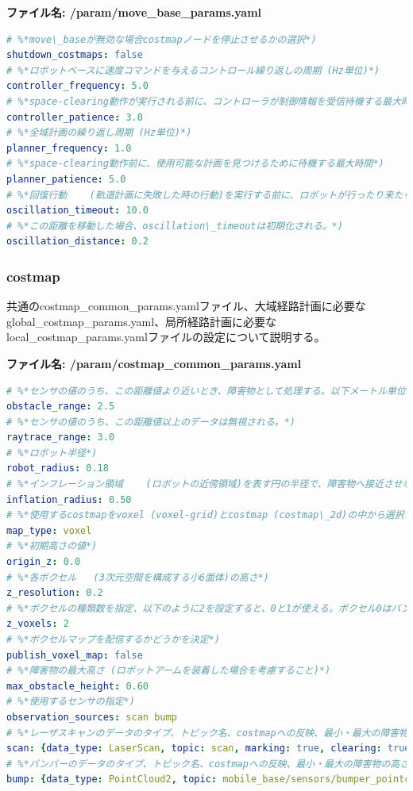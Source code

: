 \textbf{ファイル名: /param/move\_base\_params.yaml}
\begin{lstlisting}[language=YAML]
# %*move\_baseが無効な場合costmapノードを停止させるかの選択*)
shutdown_costmaps: false
# %*ロボットベースに速度コマンドを与えるコントロール繰り返しの周期 (Hz単位)*)
controller_frequency: 5.0
# %*space-clearing動作が実行される前に、コントローラが制御情報を受信待機する最大時間*)
controller_patience: 3.0
# %*全域計画の繰り返し周期 (Hz単位)*)
planner_frequency: 1.0
# %*space-clearing動作前に、使用可能な計画を見つけるために待機する最大時間*)
planner_patience: 5.0
# %*回復行動    (軌道計画に失敗した時の行動)を実行する前に、ロボットが行ったり来たりすることを可能にする時間*)
oscillation_timeout: 10.0
# %*この距離を移動した場合、oscillation\_timeoutは初期化される。*)
oscillation_distance: 0.2
\end{lstlisting}

\subsubsection{costmap}

共通のcostmap\_common\_params.yamlファイル、大域経路計画に必要なglobal\_costmap\_params.yaml、局所経路計画に必要なlocal\_costmap\_params.yamlファイルの設定について説明する。

\textbf{ファイル名: /param/costmap\_common\_params.yaml}
\begin{lstlisting}[language=YAML]
# %*センサの値のうち、この距離値より近いとき、障害物として処理する。以下メートル単位*)
obstacle_range: 2.5
# %*センサの値のうち、この距離値以上のデータは無視される。*)
raytrace_range: 3.0
# %*ロボット半径*)
robot_radius: 0.18
# %*インフレーション領域    (ロボットの近傍領域)を表す円の半径で、障害物へ接近させないようにするパラメータ*)
inflation_radius: 0.50
# %*使用するcostmapをvoxel (voxel-grid)とcostmap (costmap\_2d)の中から選択する。*)
map_type: voxel
# %*初期高さの値*)
origin_z: 0.0
# %*各ボクセル   (3次元空間を構成する小6面体)の高さ*)
z_resolution: 0.2
# %*ボクセルの種類数を指定、以下のように2を設定すると、0と1が使える。ボクセル0はバンパーが使用され、ボクセル1はレーザースキャナが使用される。*)
z_voxels: 2
# %*ボクセルマップを配信するかどうかを決定*)
publish_voxel_map: false
# %*障害物の最大高さ (ロボットアームを装着した場合を考慮すること)*)
max_obstacle_height: 0.60
# %*使用するセンサの指定*)
observation_sources: scan bump
# %*レーザスキャンのデータのタイプ、トピック名、costmapへの反映、最小・最大の障害物の高さについてのパラメータ*)
scan: {data_type: LaserScan, topic: scan, marking: true, clearing: true, min_obstacle_height: 0.25, max_obstacle_height: 0.35}
# %*バンパーのデータのタイプ、トピック名、costmapへの反映、最小・最大の障害物の高さについてのパラメータ*)
bump: {data_type: PointCloud2, topic: mobile_base/sensors/bumper_pointcloud, marking: true, clearing: false, min_obstacle_height: 0.0, max_obstacle_height: 0.15}
\end{lstlisting}

